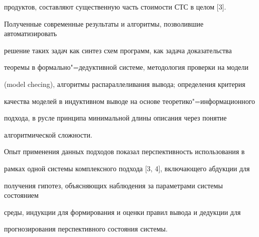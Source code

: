 продуктов, составляют существенную часть стоимости СТС в целом [3].

Полученные современные результаты и алгоритмы, позволившие автоматизировать

решение таких задач как синтез схем программ, как задача доказательства

теоремы в формально"=дедуктивной системе, методология проверки на модели

(model checing), алгоритмы распараллеливания вывода; определения критерия

качества моделей в индуктивном выводе на основе теоретико"=информационного

подхода, в русле принципа минимальной длины описания через понятие

алгоритмической сложности.



Опыт применения данных подходов показал перспективность использования в

рамках одной системы комплексного подхода [3, 4], включающего абдукции для

получения гипотез, объясняющих наблюдения за параметрами системы состоянием

среды, индукции для формирования и оценки правил вывода и дедукции для

прогнозирования перспективного состояния системы.



